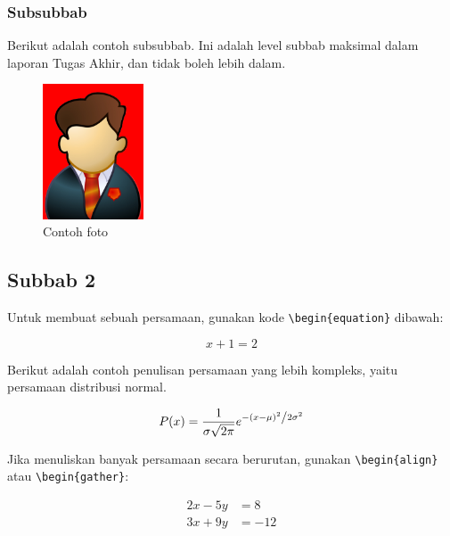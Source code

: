 \subsubsection{Subsubbab} \label{II.Subsubbab1}

Berikut adalah contoh subsubbab. Ini adalah level subbab maksimal dalam laporan Tugas Akhir, dan tidak boleh lebih dalam.

\begin{figure}[H]
	\centering
	\includegraphics[width=3cm]{figure/samplephoto.jpg}
	\caption{Contoh foto}
	\label{fig:2.foto}
\end{figure}

\subsection{Subbab 2} \label{II.Subbab2}
Untuk membuat sebuah persamaan, gunakan kode \verb|\begin{equation}| dibawah: \par

\begin{equation}
	x + 1 = 2
\end{equation}
\label{eq:2.sum}

Berikut adalah contoh penulisan persamaan yang lebih kompleks, yaitu persamaan distribusi normal. \par

\begin{equation}
	P(x) = \frac{1}{{\sigma \sqrt {2\pi } }}e^{{{ - \left( {x - \mu } \right)^2 } \mathord{\left/ {\vphantom {{ - \left( {x - \mu } \right)^2 } {2\sigma ^2 }}} \right. \kern-\nulldelimiterspace} {2\sigma ^2 }}}
\end{equation}
\label{eq:2.normal}

Jika menuliskan banyak persamaan secara berurutan, gunakan  \verb|\begin{align}| atau \verb|\begin{gather}|: \par

\begin{align} 
	2x - 5y &=  8 \\ 
	3x + 9y &=  -12
\end{align}
\label{eq:2.SPL}
